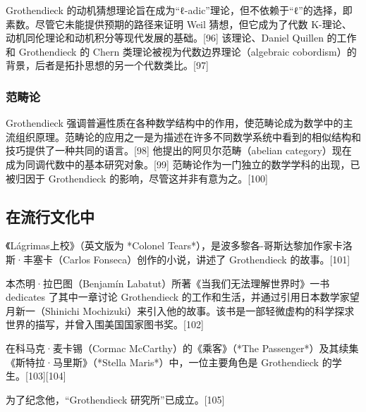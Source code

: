 Grothendieck 的动机猜想理论旨在成为“ℓ-adic”理论，但不依赖于“ℓ”的选择，即素数。尽管它未能提供预期的路径来证明 Weil 猜想，但它成为了代数 K-理论、动机同伦理论和动机积分等现代发展的基础。[96] 该理论、Daniel Quillen 的工作和 Grothendieck 的 Chern 类理论被视为代数边界理论（algebraic cobordism）的背景，后者是拓扑思想的另一个代数类比。[97]
\subsubsection{范畴论}  
Grothendieck 强调普遍性质在各种数学结构中的作用，使范畴论成为数学中的主流组织原理。范畴论的应用之一是为描述在许多不同数学系统中看到的相似结构和技巧提供了一种共同的语言。[98] 他提出的阿贝尔范畴（abelian category）现在成为同调代数中的基本研究对象。[99] 范畴论作为一门独立的数学学科的出现，已被归因于 Grothendieck 的影响，尽管这并非有意为之。[100]
\subsection{在流行文化中}  
《Lágrimas上校》（英文版为 *Colonel Tears*），是波多黎各-哥斯达黎加作家卡洛斯·丰塞卡（Carlos Fonseca）创作的小说，讲述了 Grothendieck 的故事。[101]  

本杰明·拉巴图（Benjamín Labatut）所著《当我们无法理解世界时》一书 dedicates 了其中一章讨论 Grothendieck 的工作和生活，并通过引用日本数学家望月新一（Shinichi Mochizuki）来引入他的故事。该书是一部轻微虚构的科学探求世界的描写，并曾入围美国国家图书奖。[102]  

在科马克·麦卡锡（Cormac McCarthy）的《乘客》（*The Passenger*）及其续集《斯特拉·马里斯》（*Stella Maris*）中，一位主要角色是 Grothendieck 的学生。[103][104]  

为了纪念他，“Grothendieck 研究所”已成立。[105]